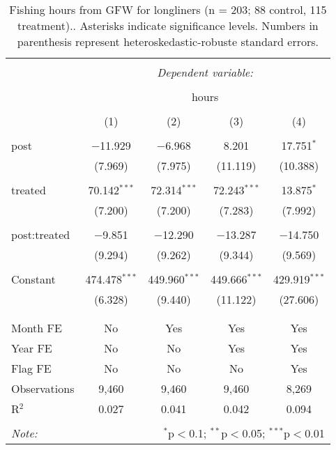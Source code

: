 \documentclass[12pt,]{article}
\begin{document}
\begin{table}[!htbp] \centering 
  \caption{\label{tab:long}Fishing hours from GFW for longliners (n = 203; 88 control, 115 treatment).. Asterisks indicate significance levels. Numbers in parenthesis represent heteroskedastic-robuste standard errors.} 
  \label{} 
\begin{tabular}{@{\extracolsep{5pt}}lcccc} 
\\[-1.8ex]\hline 
\hline \\[-1.8ex] 
 & \multicolumn{4}{c}{\textit{Dependent variable:}} \\ 
\cline{2-5} 
\\[-1.8ex] & \multicolumn{4}{c}{hours} \\ 
\\[-1.8ex] & (1) & (2) & (3) & (4)\\ 
\hline \\[-1.8ex] 
 post & $-$11.929 & $-$6.968 & 8.201 & 17.751$^{*}$ \\ 
  & (7.969) & (7.975) & (11.119) & (10.388) \\ 
  & & & & \\ 
 treated & 70.142$^{***}$ & 72.314$^{***}$ & 72.243$^{***}$ & 13.875$^{*}$ \\ 
  & (7.200) & (7.200) & (7.283) & (7.992) \\ 
  & & & & \\ 
 post:treated & $-$9.851 & $-$12.290 & $-$13.287 & $-$14.750 \\ 
  & (9.294) & (9.262) & (9.344) & (9.569) \\ 
  & & & & \\ 
 Constant & 474.478$^{***}$ & 449.960$^{***}$ & 449.666$^{***}$ & 429.919$^{***}$ \\ 
  & (6.328) & (9.440) & (11.122) & (27.606) \\ 
  & & & & \\ 
\hline \\[-1.8ex] 
Month FE & No & Yes & Yes & Yes \\ 
Year FE & No & No & Yes & Yes \\ 
Flag FE & No & No & No & Yes \\ 
Observations & 9,460 & 9,460 & 9,460 & 8,269 \\ 
R$^{2}$ & 0.027 & 0.041 & 0.042 & 0.094 \\ 
\hline 
\hline \\[-1.8ex] 
\textit{Note:}  & \multicolumn{4}{r}{$^{*}$p$<$0.1; $^{**}$p$<$0.05; $^{***}$p$<$0.01} \\ 
\end{tabular} 
\end{table}


\end{document}
